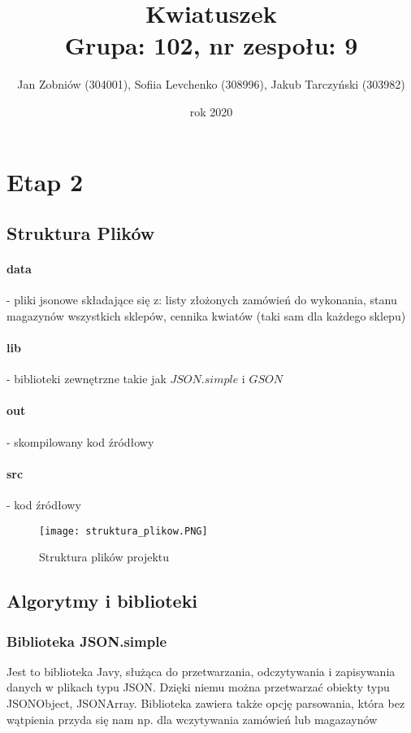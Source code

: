 \documentclass{article}
\title{Kwiatuszek \\ Grupa: 102,  nr zespołu: 9}
\author{Jan Zobniów (304001), Sofiia Levchenko (308996), Jakub Tarczyński (303982)}
\date{rok 2020}
\begin{document}
\maketitle
\tableofcontents

    \clearpage

    \section{Etap 2}
        \subsection{Struktura Plików}
            \paragraph{data} - pliki jsonowe składające się z: listy złożonych zamówień do wykonania, stanu magazynów wszystkich sklepów, cennika kwiatów (taki sam dla każdego sklepu)
            
            \paragraph{lib} - biblioteki zewnętrzne takie jak $JSON.simple$ i $GSON$ 
            
            \paragraph{out} - skompilowany kod źródłowy 
            
            \paragraph{src} - kod źródłowy 
         
        \begin{figure}[hbt]
            \centering
            \texttt{[image: struktura\_plikow.PNG]}
            \caption{Struktura plików projektu}
        \end{figure}
        
        \FloatBarrier
        
        
        \subsection{Algorytmy i biblioteki}
        \subsubsection{Biblioteka JSON.simple}
        Jest to biblioteka Javy, służąca do przetwarzania, odczytywania i zapisywania danych w plikach typu JSON. Dzięki niemu można przetwarzać obiekty typu JSONObject, JSONArray. Biblioteka zawiera także opcję parsowania, która bez wątpienia przyda się nam np. dla wczytywania zamówień lub magazaynów
        
\end{document}
